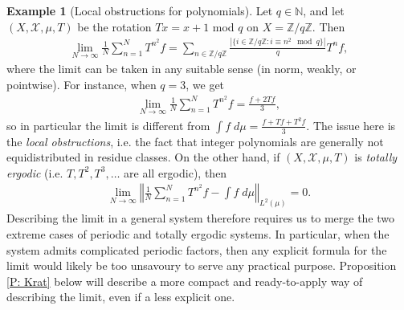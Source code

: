 \documentclass[11pt]{amsart}
\theoremstyle{definition}
\newtheorem{example}[lemma]{Example}
\DeclareMathOperator*{\E}{\mathbb{E}}
\newcommand{\N}{{\mathbb N}}
\newcommand{\Z}{{\mathbb Z}}
\newcommand{\CI}{{\mathcal I}}
\newcommand{\CX}{{\mathcal X}}
\newcommand{\norm}[1]{\left\Vert #1\right\Vert}
\newcommand{\inv}{^{-1}}
\newcommand{\1}{{\mathbf{1}}}
\begin{document}
\begin{example}[Local obstructions for polynomials]\label{Ex: n^2}
Let $q\in\N$, and let $(X, \CX, \mu, T)$ be the rotation $Tx = x + 1$ mod $q$ on  $X = \Z/q\Z$. Then 
\begin{align*}
	\lim_{N\to\infty} \frac{1}{N}\sum_{n=1}^N T^{n^2} f = \sum_{n\in\Z/q\Z}\frac{|\{i\in\Z/q\Z\colon i \equiv n^2\!\!\! \mod q\}|}{q} T^n f,
\end{align*}
where the limit can be taken in any suitable sense (in norm, weakly, or pointwise). 
For instance, when $q = 3$, we get
\begin{align*}
	\lim_{N\to\infty} \frac{1}{N}\sum_{n=1}^N T^{n^2} f = \frac{f + 2T f}{3},
\end{align*}
so in particular the limit is different from $\int f \; d\mu = \frac{f+Tf+T^2f}{3}$. The issue here is the \emph{local obstructions}, i.e. the fact that integer polynomials are generally not equidistributed in residue classes. On the other hand, if $(X, \CX, \mu, T)$ is \emph{totally ergodic} (i.e. $T, T^2, T^3, \ldots$ are all ergodic), then 
\begin{align*}
\lim_{N\to\infty} \norm{\frac{1}{N}\sum_{n=1}^N T^{n^2} f - \int f\; d\mu}_{L^2(\mu)} = 0.
\end{align*}
Describing the limit in a general system therefore requires us to merge the two extreme cases of periodic and totally ergodic systems. In particular, when the system admits complicated periodic factors, then any explicit formula for the limit would likely be too unsavoury to serve any practical purpose. Proposition \ref{P: Krat} below will describe a more compact and ready-to-apply way of describing the limit, even if a less explicit one.
\end{example}


\end{document}
